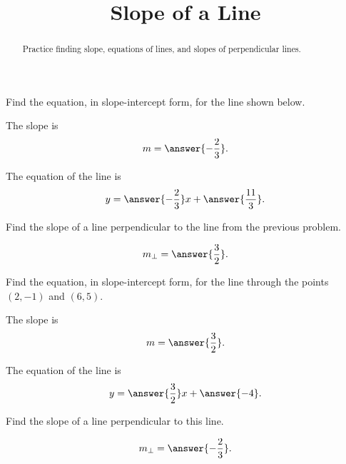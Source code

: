 \documentclass{ximera}
\title{Slope of a Line}
\begin{document}
\begin{abstract}
  Practice finding slope, equations of lines, and slopes of perpendicular lines.
\end{abstract}

\maketitle

\begin{problem}
Find the equation, in slope-intercept form, for the line shown below.

\begin{center}
\end{center}

The slope is
\[
m=\answer{-\frac{2}{3}}.
\]

The equation of the line is
\[
y=\answer{-\frac{2}{3}}x+\answer{\frac{11}{3}}.
\]
\end{problem}

\begin{problem}
Find the slope of a line perpendicular to the line from the previous problem.

\[
m_{\perp}=\answer{\frac{3}{2}}.
\]
\end{problem}

\begin{problem}
Find the equation, in slope-intercept form, for the line through the points $(2,-1)$ and $(6,5)$.

The slope is
\[
m=\answer{\frac{3}{2}}.
\]

The equation of the line is
\[
y=\answer{\frac{3}{2}}x+\answer{-4}.
\]

Find the slope of a line perpendicular to this line.

\[
m_{\perp}=\answer{-\frac{2}{3}}.
\]
\end{problem}
\end{document}
